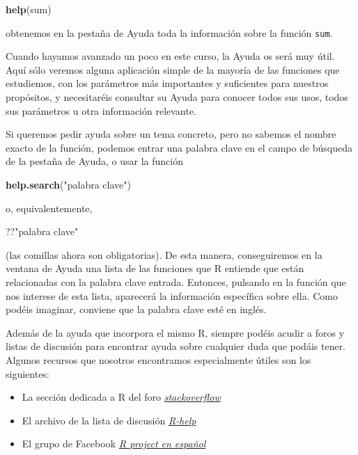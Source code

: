 \documentclass[]{book}
\newenvironment{Shaded}{\begin{snugshade}}{\end{snugshade}}
\newcommand{\KeywordTok}[1]{\textcolor[rgb]{0.13,0.29,0.53}{\textbf{#1}}}
\newcommand{\NormalTok}[1]{#1}
\newcommand{\StringTok}[1]{\textcolor[rgb]{0.31,0.60,0.02}{#1}}
\providecommand{\tightlist}{%
  \setlength{\itemsep}{0pt}\setlength{\parskip}{0pt}}
\theoremstyle{definition}
\theoremstyle{definition}
\theoremstyle{definition}
\theoremstyle{remark}
\begin{document}
\begin{Shaded}
\begin{Highlighting}[]
\KeywordTok{help}\NormalTok{(sum)}
\end{Highlighting}
\end{Shaded}

obtenemos en la pestaña de Ayuda toda la información sobre la función \texttt{sum}.

Cuando hayamos avanzado un poco en este curso, la Ayuda os será muy útil. Aquí sólo veremos alguna aplicación simple de la mayoría de las funciones que estudiemos, con los parámetros más importantes y suficientes para nuestros propósitos, y necesitaréis consultar su Ayuda para conocer todos sus usos, todos sus parámetros u otra información relevante.

Si queremos pedir ayuda sobre un tema concreto, pero no sabemos el nombre exacto de la función, podemos entrar una palabra clave en el campo de búsqueda de la pestaña de Ayuda, o usar la función

\begin{Shaded}
\begin{Highlighting}[]
\KeywordTok{help.search}\NormalTok{(}\StringTok{"palabra clave"}\NormalTok{)}
\end{Highlighting}
\end{Shaded}

o, equivalentemente,

\begin{Shaded}
\begin{Highlighting}[]
\NormalTok{??}\StringTok{"palabra clave"}
\end{Highlighting}
\end{Shaded}

(las comillas ahora son obligatorias). De esta manera, conseguiremos en la ventana de Ayuda una lista de las funciones que R entiende que están relacionadas con la palabra clave entrada. Entonces, pulsando en la función que nos interese de esta lista, aparecerá la información específica sobre ella.
Como podéis imaginar, conviene que la palabra clave esté en inglés.

Además de la ayuda que incorpora el mismo R, siempre podéis acudir a foros y listas de discusión para encontrar ayuda sobre cualquier duda que podáis tener. Algunos recursos que nosotros encontramos especialmente útiles son los siguientes:

\begin{itemize}
\tightlist
\item
  La sección dedicada a R del foro \href{http://stackoverflow.com/questions/tagged/r}{\emph{stackoverflow}}
\item
  El archivo de la lista de discusión \href{http://r.789695.n4.nabble.com/r-help-f789696.html}{\emph{R-help}}
\item
  El grupo de Facebook \href{https://www.facebook.com/groups/rprojectsp}{\emph{R project en español}}
\end{itemize}
\end{document}
